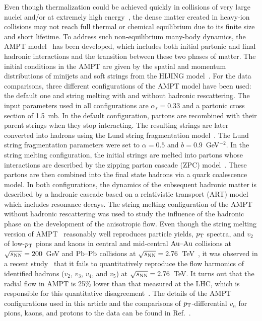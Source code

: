 Even though thermalization could be achieved quickly in collisions of very large nuclei and/or at extremely high energy~\cite{Kurkela:2015qoa}, the dense matter created in heavy-ion collisions may not reach full thermal or chemical equilibrium due to its finite size and short lifetime. To address such non-equilibrium many-body dynamics, the AMPT model~\cite{Zhang:1999bd,Lin:2000cx,Lin:2004en} has been developed, which includes both initial partonic and final hadronic interactions and the transition between these two phases of matter.
The initial conditions in the AMPT are given by the spatial and momentum distributions of minijets and soft strings from the HIJING model~\cite{Wang:1991hta,Gyulassy:1994ew}.
For the data comparisons, three different configurations of the AMPT model have been used: the default one and string melting with and without hadronic rescattering. The input parameters used in all configurations are $\alpha_s = 0.33$ and a partonic cross section of 1.5~mb.
In the default configuration, partons are recombined with their parent strings when they stop interacting. The resulting strings are later converted into hadrons using the Lund string fragmentation model~\cite{Andersson:1986gw,NilssonAlmqvist:1986rx}.
The Lund string fragmentation parameters were set to $\alpha = 0.5$ and $b = 0.9$~GeV$^{-2}$.
In the string melting configuration, the initial strings are melted into partons whose interactions are described by the zipping parton cascade (ZPC) model~\cite{Zhang:1997ej}. These partons are then combined into the final state hadrons via a quark coalescence model. 
In both configurations, the dynamics of the subsequent hadronic matter is described by a hadronic cascade based on a relativistic transport (ART) model~\cite{Li:2001xh} which includes resonance decays.
The string melting configuration of the AMPT without hadronic rescattering was used to study the influence of the hadronic phase on the development of the anisotropic flow.
Even though the string melting version of AMPT~\cite{Lin:2001zk,Lin:2004en} reasonably well reproduces particle yields, $p_{\rm T}$ spectra, and $v_2$ of low-$p_{\rm T}$ pions and kaons in central and mid-central $\textnormal{Au--Au}$ collisions at $\sqrt{s_{\textnormal{NN}}}=200$~GeV and $\textnormal{Pb--Pb}$ collisions at $\sqrt{s_{\textnormal{NN}}}=2.76$~TeV~\cite{Lin:2014tya}, it was observed in a recent study~\cite{Adam:2016nfo} that it fails to quantitatively reproduce the flow harmonics of identified hadrons ($v_2$, $v_3$, $v_4$, and $v_5$) at $\sqrt{s_{\textnormal{NN}}}=2.76$~TeV. It turns out that the radial flow in AMPT is 25\% lower than that measured at the LHC, which is responsible for this quantitative disagreement~\cite{Adam:2016nfo}. The details of the AMPT configurations used in this article and the comparisons of $p_{\rm T}$-differential $v_{n}$ for pions, kaons, and protons to the data can be found in Ref.~\cite{Adam:2016nfo}.

